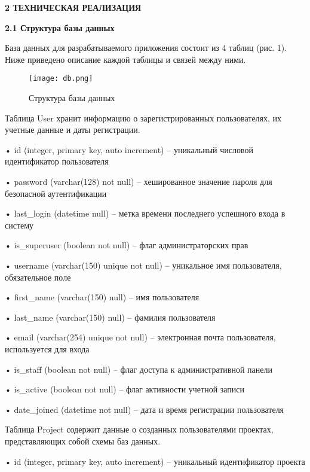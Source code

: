 \newpage
\begin{center}
  \textbf{2 ТЕХНИЧЕСКАЯ РЕАЛИЗАЦИЯ}
\end{center}


\textbf{2.1 Структура базы данных}

База данных для разрабатываемого приложения состоит из 4 таблиц (рис. 1). Ниже приведено описание каждой таблицы и связей между ними.

\renewcommand{\figurename}{Рисунок}
\begin{figure}[htbp]
    \centering 
    \texttt{[image: db.png]} 
    \caption{Структура базы данных}
\end{figure}

Таблица User хранит информацию о зарегистрированных пользователях, их учетные данные и даты регистрации.

• id (integer, primary key, auto increment) – уникальный числовой идентификатор пользователя

• password (varchar(128) not null) – хешированное значение пароля для безопасной аутентификации

• last\_login (datetime null) – метка времени последнего успешного входа в систему

• is\_superuser (boolean not null) – флаг администраторских прав

• username (varchar(150) unique not null) – уникальное имя пользователя, обязательное поле

• first\_name (varchar(150) null) – имя пользователя

• last\_name (varchar(150) null) – фамилия пользователя

• email (varchar(254) unique not null) – электронная почта пользователя, используется для входа

• is\_staff (boolean not null) – флаг доступа к административной панели

• is\_active (boolean not null) – флаг активности учетной записи

• date\_joined (datetime not null) – дата и время регистрации пользователя


Таблица Project содержит данные о созданных пользователями проектах, представляющих собой схемы баз данных.

• id (integer, primary key, auto increment) – уникальный идентификатор проекта

